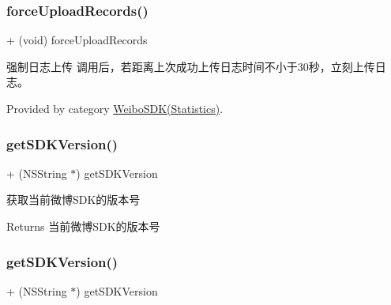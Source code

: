 \subsubsection{\texorpdfstring{force\+Upload\+Records()}{forceUploadRecords()}\hspace{0.1cm}{\footnotesize\ttfamily [3/3]}}
{\footnotesize\ttfamily + (void) force\+Upload\+Records \begin{DoxyParamCaption}{ }\end{DoxyParamCaption}}

强制日志上传 调用后，若距离上次成功上传日志时间不小于30秒，立刻上传日志。 

Provided by category \mbox{\hyperlink{category_weibo_s_d_k_07_statistics_08_ab5d6291270ebed0084a505e009bc15a2}{Weibo\+S\+D\+K(\+Statistics)}}.

\mbox{\label{interface_weibo_s_d_k_a691f8c3d5605163a7873eb0dbc754f79}} 
\subsubsection{\texorpdfstring{get\+S\+D\+K\+Version()}{getSDKVersion()}\hspace{0.1cm}{\footnotesize\ttfamily [1/3]}}
{\footnotesize\ttfamily + (N\+S\+String $\ast$) get\+S\+D\+K\+Version \begin{DoxyParamCaption}{ }\end{DoxyParamCaption}}

获取当前微博\+S\+D\+K的版本号 \begin{DoxyReturn}{Returns}
当前微博\+S\+D\+K的版本号 
\end{DoxyReturn}
\mbox{\label{interface_weibo_s_d_k_a691f8c3d5605163a7873eb0dbc754f79}} 
\subsubsection{\texorpdfstring{get\+S\+D\+K\+Version()}{getSDKVersion()}\hspace{0.1cm}{\footnotesize\ttfamily [2/3]}}
{\footnotesize\ttfamily + (N\+S\+String $\ast$) get\+S\+D\+K\+Version \begin{DoxyParamCaption}{ }\end{DoxyParamCaption}}

